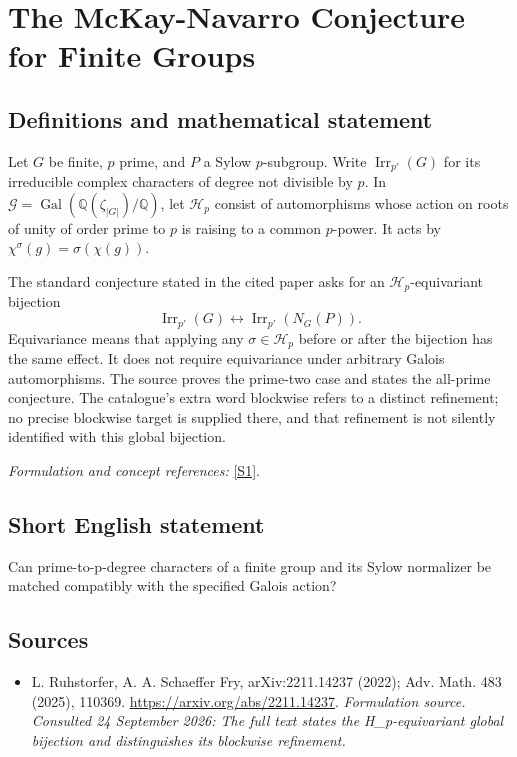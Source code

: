 \documentclass[11pt]{article}
\begin{document}
\section*{\texorpdfstring{The McKay-Navarro Conjecture for Finite Groups}{The McKay-Navarro Conjecture for Finite Groups}}\label{statement}
\subsection{Definitions and mathematical statement}
Let $G$ be finite, $p$ prime, and $P$ a Sylow $p$-subgroup. Write $\operatorname{Irr}_{p'}(G)$ for its irreducible complex characters of degree not divisible by $p$. In $\mathcal G=\operatorname{Gal}({\mathbb{Q}}(\zeta_{|G|})/{\mathbb{Q}})$, let $\mathcal H_p$ consist of automorphisms whose action on roots of unity of order prime to $p$ is raising to a common $p$-power. It acts by $\chi^\sigma(g)=\sigma(\chi(g))$.

The standard conjecture stated in the cited paper asks for an $\mathcal H_p$-equivariant bijection
\[
 \operatorname{Irr}_{p'}(G)\longleftrightarrow
 \operatorname{Irr}_{p'}(N_G(P)).
\]
Equivariance means that applying any $\sigma\in\mathcal H_p$ before or after the bijection has the same effect. It does not require equivariance under arbitrary Galois automorphisms. The source proves the prime-two case and states the all-prime conjecture. The catalogue's extra word blockwise refers to a distinct refinement; no precise blockwise target is supplied there, and that refinement is not silently identified with this global bijection.
\par\smallskip\textit{Formulation and concept references:} \href{https://arxiv.org/abs/2211.14237}{[S1]}.

\subsection{Short English statement}
Can prime-to-p-degree characters of a finite group and its Sylow normalizer be matched compatibly with the specified Galois action?
\subsection{Sources}
\begin{itemize}
\item[S1]L. Ruhstorfer, A. A. Schaeffer Fry, arXiv:2211.14237 (2022); Adv. Math. 483 (2025), 110369.
\url{https://arxiv.org/abs/2211.14237}.
\textit{Formulation source. Consulted 24 September 2026: The full text states the H\_p-equivariant global bijection and distinguishes its blockwise refinement.}
\end{itemize}
\end{document}
